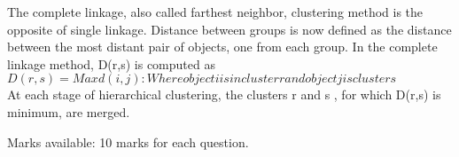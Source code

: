 \documentclass{article}
\begin{document}
\begin{enumerate}
The complete linkage, also called farthest neighbor, clustering method
is the opposite of single linkage.  Distance between groups is now
defined as the distance between the most distant pair of objects, one
from each group. 
In the complete linkage method, D(r,s) is computed as \\
$D(r,s) = Max {d(i,j) : Where object i is in cluster r and object j is
 cluster s}$ \\
At each stage of hierarchical clustering, the clusters r and s , for
which D(r,s) is minimum, are merged.


\end{enumerate} %

Marks available: 10 marks for each question. 
\end{document}
